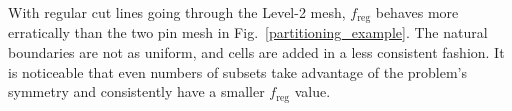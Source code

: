 \begin{table}[ht]
\centering
\caption{The tabulated results of the parametric study shown in Fig.~\ref{level2_metric_study} with no load balancing, 5 original load balancing iterations (LB), and 5 load-balancing-by-dimension (LBD) iterations for the Level-2 mesh.}
\label{level2_metric_study_table}
\end{table}

With regular cut lines going through the Level-2 mesh, $f_\text{reg}$ behaves more erratically than the two pin mesh in Fig.~\ref{partitioning_example}. The natural boundaries are not as uniform, and cells are added in a less consistent fashion. It is noticeable that even numbers of subsets take advantage of the problem's symmetry and consistently have a smaller $f_\text{reg}$ value.

